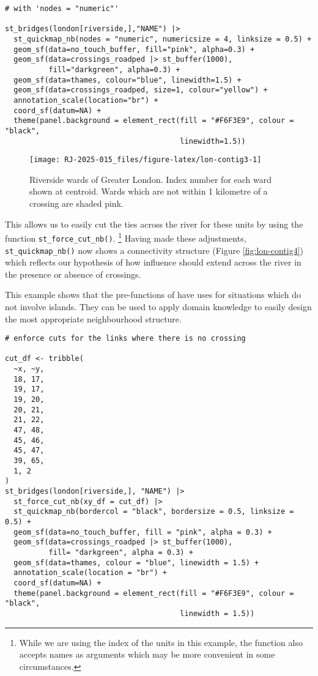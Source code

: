 \begin{verbatim}
# with 'nodes = "numeric"'

st_bridges(london[riverside,],"NAME") |>
  st_quickmap_nb(nodes = "numeric", numericsize = 4, linksize = 0.5) +
  geom_sf(data=no_touch_buffer, fill="pink", alpha=0.3) +
  geom_sf(data=crossings_roadped |> st_buffer(1000),
          fill="darkgreen", alpha=0.3) +
  geom_sf(data=thames, colour="blue", linewidth=1.5) +
  geom_sf(data=crossings_roadped, size=1, colour="yellow") +
  annotation_scale(location="br") +
  coord_sf(datum=NA) +
  theme(panel.background = element_rect(fill = "#F6F3E9", colour = "black",
                                        linewidth=1.5))
\end{verbatim}

\begin{figure}

{\centering \texttt{[image: RJ-2025-015\_files/figure-latex/lon-contig3-1]} 

}

\caption{Riverside wards of Greater London. Index number for each ward shown at centroid. Wards which are not within 1 kilometre of a crossing are shaded pink. }\label{fig:lon-contig3}
\end{figure}

This allows us to easily cut the ties across the river for these units by using the function \texttt{st\_force\_cut\_nb()}. \footnote{While we are using the index of the units in this example, the function also
  accepts names as arguments which may be more convenient in some circumstances.} Having made these adjustments,
\texttt{st\_quickmap\_nb()} now shows a connectivity structure (Figure \ref{fig:lon-contig4}) which reflects our hypothesis of how influence should extend across the river in the presence or absence of crossings.

This example shows that the pre-functions of  have uses for situations which do not involve islands. They can be used to apply domain knowledge to easily design the most appropriate neighbourhood structure.

\begin{verbatim}
# enforce cuts for the links where there is no crossing

cut_df <- tribble(
  ~x, ~y,
  18, 17,
  19, 17,
  19, 20,
  20, 21,
  21, 22,
  47, 48,
  45, 46,
  45, 47,
  39, 65,
  1, 2
)
st_bridges(london[riverside,], "NAME") |>
  st_force_cut_nb(xy_df = cut_df) |>
  st_quickmap_nb(bordercol = "black", bordersize = 0.5, linksize = 0.5) +
  geom_sf(data=no_touch_buffer, fill = "pink", alpha = 0.3) +
  geom_sf(data=crossings_roadped |> st_buffer(1000),
          fill= "darkgreen", alpha = 0.3) +
  geom_sf(data=thames, colour = "blue", linewidth = 1.5) +
  annotation_scale(location = "br") +
  coord_sf(datum=NA) +
  theme(panel.background = element_rect(fill = "#F6F3E9", colour = "black",
                                        linewidth = 1.5))
\end{verbatim}

